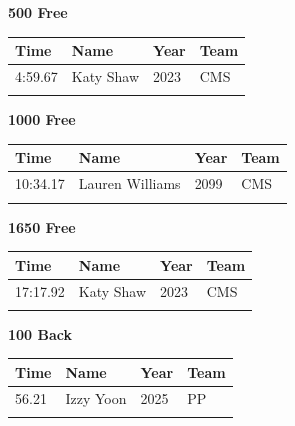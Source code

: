 \vspace{1.2em}
\noindent\begin{minipage}[t]{0.98\textwidth}
\centering
\textbf{\textcolor{teamprimary}{500 Free}}\par
\vspace{0.5em}
\centering
\small
\renewcommand{\arraystretch}{1.0}
\setlength{\tabcolsep}{4pt}
\begin{tabular}{@{}p{2.5cm}p{4.5cm}p{1.5cm}p{2.5cm}@{}}
\toprule
\textbf{Time} & \textbf{Name} & \textbf{Year} & \textbf{Team} \\
\midrule
4:59.67 & Katy Shaw & 2023 & CMS \\
\bottomrule
\vspace{0.5em}
\end{tabular}
\end{minipage}
\vspace{1.2em}
\noindent\begin{minipage}[t]{0.98\textwidth}
\centering
\textbf{\textcolor{teamprimary}{1000 Free}}\par
\vspace{0.5em}
\centering
\small
\renewcommand{\arraystretch}{1.0}
\setlength{\tabcolsep}{4pt}
\begin{tabular}{@{}p{2.5cm}p{4.5cm}p{1.5cm}p{2.5cm}@{}}
\toprule
\textbf{Time} & \textbf{Name} & \textbf{Year} & \textbf{Team} \\
\midrule
10:34.17 & Lauren Williams & 2099 & CMS \\
\bottomrule
\vspace{0.5em}
\end{tabular}
\end{minipage}
\vspace{1.2em}
\noindent\begin{minipage}[t]{0.98\textwidth}
\centering
\textbf{\textcolor{teamprimary}{1650 Free}}\par
\vspace{0.5em}
\centering
\small
\renewcommand{\arraystretch}{1.0}
\setlength{\tabcolsep}{4pt}
\begin{tabular}{@{}p{2.5cm}p{4.5cm}p{1.5cm}p{2.5cm}@{}}
\toprule
\textbf{Time} & \textbf{Name} & \textbf{Year} & \textbf{Team} \\
\midrule
17:17.92 & Katy Shaw & 2023 & CMS \\
\bottomrule
\vspace{0.5em}
\end{tabular}
\end{minipage}
\vspace{1.2em}
\noindent\begin{minipage}[t]{0.98\textwidth}
\centering
\textbf{\textcolor{teamprimary}{100 Back}}\par
\vspace{0.5em}
\centering
\small
\renewcommand{\arraystretch}{1.0}
\setlength{\tabcolsep}{4pt}
\begin{tabular}{@{}p{2.5cm}p{4.5cm}p{1.5cm}p{2.5cm}@{}}
\toprule
\textbf{Time} & \textbf{Name} & \textbf{Year} & \textbf{Team} \\
\midrule
56.21 & Izzy Yoon & 2025 & PP \\
\bottomrule
\vspace{0.5em}
\end{tabular}
\end{minipage}

